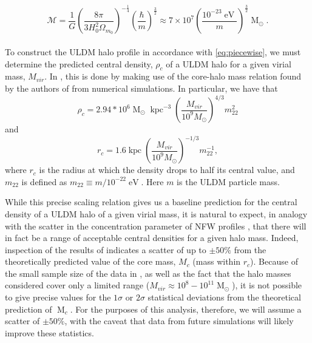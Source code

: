 \documentclass[a4paper,11pt]{article}
\begin{document}
\begin{equation}\label{eq:mass}
    \mathcal{M}=\frac{1}{G}\left(\frac{8\pi}{3 H_0^2\Omega_{m_0}}\right)^{-\frac{1}{4}}\left(\frac{\hbar}{m}\right)^{\frac{3}{2}}\approx 7\times 10^7\left(\frac{10^{-23}\operatorname{eV}}{m}\right)^{\frac{3}{2}}\operatorname{M}_{\odot}.
\end{equation}
\\

To construct the ULDM halo profile in accordance with \ref{eq:piecewise}, we must determine the predicted central density, $\rho_c$ of a ULDM halo for a given virial mass, $M_{vir}$. In \cite{Robles:2018fur}, this is done by making use of the core-halo mass relation found by the authors of \cite{Schive:2014hza} from numerical simulations. In particular, we have that 
\begin{equation}\label{eq:central_dens}
    \rho_c = 2.94*10^6 \operatorname{M}_{\odot}\operatorname{kpc}^{-3}\left(\frac{M_{vir}}{10^9 M_{\odot}}\right)^{4/3}m_{22}^{2}
\end{equation}
and 
\begin{equation}
    r_c = 1.6 \operatorname{kpc}\left(\frac{M_{vir}}{10^9 M_{\odot}}\right)^{-1/3}m_{22}^{-1},
\end{equation}
where $r_c$ is the radius at which the density drops to half its central value, and $m_{22}$ is defined as $m_{22} \equiv m / 10^{-22} \operatorname{eV}$. Here $m$ is the ULDM particle mass. 

While this precise scaling relation gives us a baseline prediction for the central density of a ULDM halo of a given virial mass, it is natural to expect, in analogy with the scatter in the concentration parameter of NFW profiles \cite{Maccio:2008pcd}, that there will in fact be a range of acceptable central densities for a given halo  mass. Indeed, inspection of the results of \cite{Schive:2014hza} indicates a scatter of up to $\pm 50\%$ from the theoretically predicted value of the core mass, $M_c$ (mass within $r_c$). Because of the small sample size of the data in \cite{Schive:2014hza}, as well as the fact that the halo masses considered cover only a limited range ($ M_{vir} \approx 10^8-10^{11} \operatorname{M}_{\odot}$), it is not possible to give precise values for the $1\sigma$  or $2 \sigma$ statistical deviations from the theoretical prediction of  $\operatorname{M}_c$. For the purposes of this analysis, therefore,  we will assume a scatter of $\pm 50\%$, with the caveat that data from future simulations will likely improve these statistics.
\end{document}
